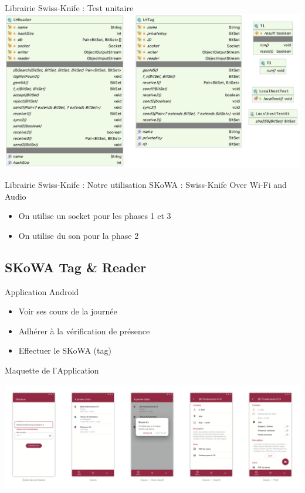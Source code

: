 \documentclass[aspectratio=169]{beamer}
\begin{document}
\begin{frame}{Librairie Swiss-Knife : Test unitaire}
  \centering
  \includegraphics[height=.9\textheight]{../assets/uml_test_detail}
\end{frame}

\begin{frame}{Librairie Swiss-Knife : Notre utilisation}
  SKoWA : Swiss-Knife Over Wi-Fi and Audio
  \bigskip

  \begin{itemize}
    \item On utilise un socket pour les phases 1 et 3
    \item On utilise du son pour la phase 2
  \end{itemize}
\end{frame}

\subsection{SKoWA Tag \& Reader}

\begin{frame}{Application Android}

  \begin{itemize}
    \item Voir ses cours de la journée
    \item Adhérer à la vérification de présence
    \item Effectuer le SKoWA (tag)
  \end{itemize}

\end{frame}

\begin{frame}{Maquette de l'Application}
  \begin{adjustwidth}{-1.8em}{2em}
    \centering
    \includegraphics[width=1.1\textwidth]{../assets/maquette.png}
  \end{adjustwidth}
\end{frame}
\end{document}
